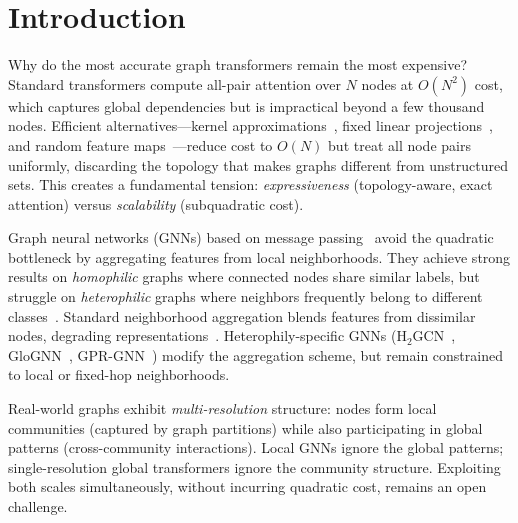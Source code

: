 \documentclass[manuscript, screen, review, anonymous]{acmart}
\begin{document}


\maketitle

\section{Introduction}
\label{sec:intro}

Why do the most accurate graph transformers remain the most expensive? Standard transformers compute all-pair attention over $N$ nodes at $O(N^2)$ cost, which captures global dependencies but is impractical beyond a few thousand nodes. Efficient alternatives---kernel approximations~\cite{wu2022nodeformer}, fixed linear projections~\cite{wu2023sgformer}, and random feature maps~\cite{wu2023difformer}---reduce cost to $O(N)$ but treat all node pairs uniformly, discarding the topology that makes graphs different from unstructured sets. This creates a fundamental tension: \emph{expressiveness} (topology-aware, exact attention) versus \emph{scalability} (subquadratic cost).

Graph neural networks (GNNs) based on message passing~\cite{gilmer2017mpnn, kipf2017semi, scarselli2009gnn} avoid the quadratic bottleneck by aggregating features from local neighborhoods. They achieve strong results on \emph{homophilic} graphs where connected nodes share similar labels, but struggle on \emph{heterophilic} graphs where neighbors frequently belong to different classes~\cite{zhu2020h2gcn, pei2020geomgcn}. Standard neighborhood aggregation blends features from dissimilar nodes, degrading representations~\cite{li2018oversmoothing}. Heterophily-specific GNNs (H$_2$GCN~\cite{zhu2020h2gcn}, GloGNN~\cite{li2022glognn}, GPR-GNN~\cite{chien2021gprgnn}) modify the aggregation scheme, but remain constrained to local or fixed-hop neighborhoods.

Real-world graphs exhibit \emph{multi-resolution} structure: nodes form local communities (captured by graph partitions) while also participating in global patterns (cross-community interactions). Local GNNs ignore the global patterns; single-resolution global transformers ignore the community structure. Exploiting both scales simultaneously, without incurring quadratic cost, remains an open challenge.
\end{document}
